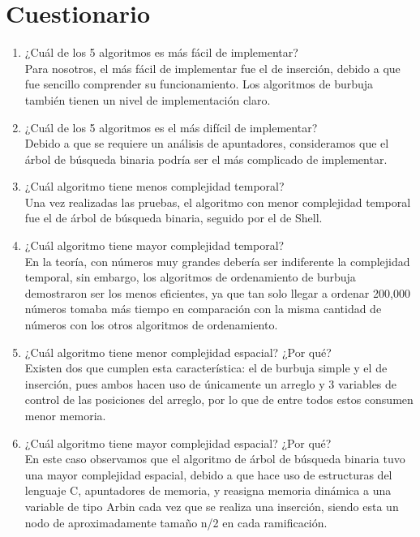 \documentclass[12pt]{article}
\begin{document}
		\section{Cuestionario}
		    \begin{enumerate}
		        \item ¿Cuál de los 5 algoritmos es más fácil de implementar?\\
		        Para nosotros, el más fácil de implementar fue el de inserción, debido a que fue sencillo comprender su funcionamiento. Los algoritmos de burbuja también tienen un nivel de implementación claro.\\
		        \item ¿Cuál de los 5 algoritmos es el más difícil de implementar?\\
		        Debido a que se requiere un análisis de apuntadores, consideramos que el árbol de búsqueda binaria podría ser el más complicado de implementar.\\
		        \newpage
		        \item ¿Cuál algoritmo tiene menos complejidad temporal?\\
		        Una vez realizadas las pruebas, el algoritmo con menor complejidad temporal fue el de árbol de búsqueda binaria, seguido por el de Shell.\\
		        
		        \item ¿Cuál algoritmo tiene mayor complejidad temporal?\\
		        En la teoría, con números muy grandes debería ser indiferente la complejidad temporal, sin embargo, los algoritmos de ordenamiento de burbuja demostraron ser los menos eficientes, ya que tan solo llegar a ordenar 200,000 números tomaba más tiempo en comparación con la misma cantidad de números con los otros algoritmos de ordenamiento.\\
		        
		        \item ¿Cuál algoritmo tiene menor complejidad espacial? ¿Por qué?\\
                Existen dos que cumplen esta característica: el de burbuja simple y el de inserción, pues ambos hacen uso de únicamente un arreglo y 3 variables de control de las posiciones del arreglo, por lo que de entre todos estos consumen menor memoria.\\
		        
		        \item ¿Cuál algoritmo tiene mayor complejidad espacial? ¿Por qué?\\
		        En este caso observamos que el algoritmo de árbol de búsqueda binaria tuvo una mayor complejidad espacial, debido a que hace uso de estructuras del lenguaje C, apuntadores de memoria, y reasigna memoria dinámica a una variable de tipo Arbin cada vez que se realiza una inserción, siendo esta un nodo de aproximadamente tamaño n/2 en cada ramificación. \\
		        

\end{enumerate}
\end{document}
